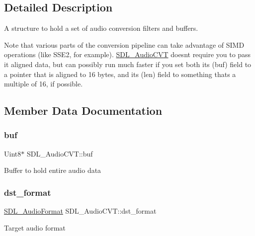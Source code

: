 \subsection{Detailed Description}
A structure to hold a set of audio conversion filters and buffers. 

Note that various parts of the conversion pipeline can take advantage of S\+I\+MD operations (like S\+S\+E2, for example). \hyperlink{structSDL__AudioCVT}{S\+D\+L\+\_\+\+Audio\+C\+VT} doesn\textquotesingle{}t require you to pass it aligned data, but can possibly run much faster if you set both its (buf) field to a pointer that is aligned to 16 bytes, and its (len) field to something that\textquotesingle{}s a multiple of 16, if possible. 

\subsection{Member Data Documentation}
\mbox{\label{structSDL__AudioCVT_a080db27b929efa983c5161360ffce310}} 
\subsubsection{\texorpdfstring{buf}{buf}}
{\footnotesize\ttfamily Uint8$\ast$ S\+D\+L\+\_\+\+Audio\+C\+V\+T\+::buf}

Buffer to hold entire audio data \mbox{\label{structSDL__AudioCVT_a8f890d017be857a3b048bf00525736c6}} 
\subsubsection{\texorpdfstring{dst\+\_\+format}{dst\_format}}
{\footnotesize\ttfamily \hyperlink{SDL__audio_8h_a491ed103fd25d920c4e6b7495217ce66}{S\+D\+L\+\_\+\+Audio\+Format} S\+D\+L\+\_\+\+Audio\+C\+V\+T\+::dst\+\_\+format}

Target audio format \mbox{\label{structSDL__AudioCVT_a35093b3ad3331c17416c593a76012b63}} 
